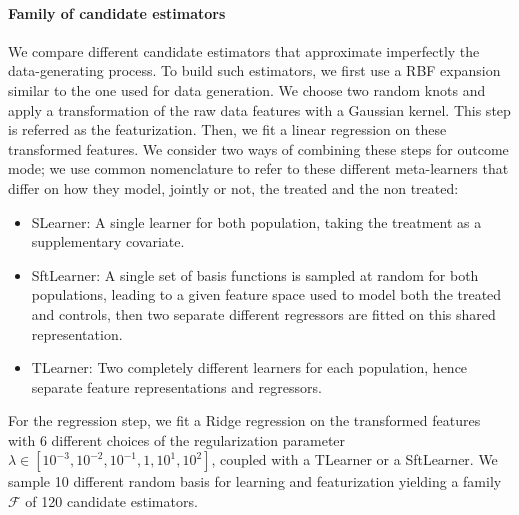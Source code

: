 \documentclass[10pt,twocolumn]{article}
\begin{document}
%

\paragraph{Family of candidate estimators}

We compare different candidate estimators that approximate imperfectly the
data-generating process. To build such estimators, we first use a RBF
expansion similar to the one used for data generation. We choose two random
knots and apply a transformation of the raw data features with a Gaussian
kernel. This step is referred as the featurization. Then, we fit a linear
regression on these transformed features. We consider two ways of combining
these steps for outcome mode; we use common nomenclature
\cite{kunzel_metalearners_2019,shen2023rctrep} to refer to these different
meta-learners that differ on how they model, jointly or not, the treated and the
non treated:
\begin{itemize}
    \item SLearner: A single learner for both population, taking the treatment as
          a supplementary covariate.
    \item SftLearner: A single set of basis functions is sampled at random for both
          populations, leading to a given feature space used to model both the treated and
          controls, then two
          separate different regressors are fitted on this shared representation.
    \item TLearner: Two completely different learners for each population, hence
          separate feature representations and regressors.
\end{itemize}


For the regression step, we fit a Ridge regression on the transformed features
with 6 different choices of the regularization parameter $\lambda \in [10^{-3},
        10^{-2}, 10^{-1}, 1, 10^{1}, 10^{2}]$, coupled with a TLearner or a SftLearner.
We sample 10 different random basis for learning and
featurization yielding a family $\mathcal F$ of 120 candidate estimators.
%
\end{document}

